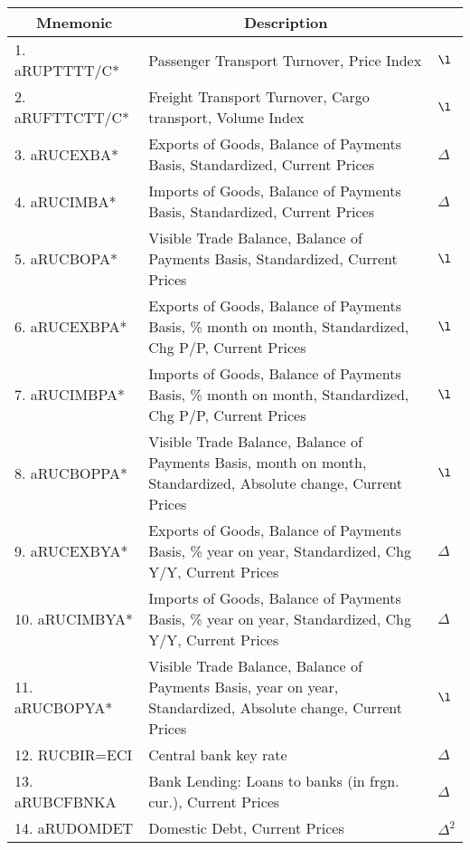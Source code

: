\documentclass[a4paper, 14pt]{article}
\begin{document}
\begin{center}
	\begin{longtable}{p{5.5cm} p{10cm} p{0.15cm}} 
		
		\hline \hline \multicolumn{1}{c}{\textbf{Mnemonic}} & \multicolumn{1}{c}{\textbf{Description}} & \multicolumn{1}{c}{\textbf{}} \\ \hline 
		\endfirsthead
		
		
	
		\endhead
		
		
		\endfoot
		
		\hline \hline
		\endlastfoot
		
	1. aRUPTTTT/C* &  Passenger Transport Turnover, Price Index & $\l$\\
	2. aRUFTTCTT/C* &  Freight Transport Turnover, Cargo transport, Volume Index & $\l$\\
	3. aRUCEXBA* &  Exports of Goods, Balance of Payments Basis, Standardized, Current Prices & $\Delta$\\
	4. aRUCIMBA* &  Imports of Goods, Balance of Payments Basis, Standardized, Current Prices & $\Delta$\\
	5. aRUCBOPA* &  Visible Trade Balance, Balance of Payments Basis, Standardized, Current Prices & $\l$\\
	6. aRUCEXBPA* &  Exports of Goods, Balance of Payments Basis, \% month on month, Standardized, Chg P/P, Current Prices & $\l$\\
	7. aRUCIMBPA* &  Imports of Goods, Balance of Payments Basis, \% month on month, Standardized, Chg P/P, Current Prices & $\l$\\
	8. aRUCBOPPA* &  Visible Trade Balance, Balance of Payments Basis, month on month, Standardized, Absolute change, Current Prices & $\l$\\
	9. aRUCEXBYA* &  Exports of Goods, Balance of Payments Basis, \% year on year, Standardized, Chg Y/Y, Current Prices & $\Delta$\\
	10. aRUCIMBYA* &  Imports of Goods, Balance of Payments Basis, \% year on year, Standardized, Chg Y/Y, Current Prices & $\Delta$\\
	11. aRUCBOPYA* &  Visible Trade Balance, Balance of Payments Basis, year on year, Standardized, Absolute change, Current Prices & $\l$\\
	12. RUCBIR=ECI &  Central bank key rate & $\Delta$\\
	13. aRUBCFBNKA &  Bank Lending: Loans to banks (in frgn. cur.), Current Prices & $\Delta$\\
	14. aRUDOMDET &  Domestic Debt, Current Prices & $\Delta^2$\\

\end{longtable}
\end{center}
\end{document}
